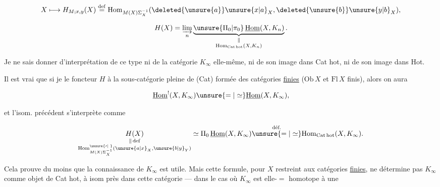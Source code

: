 
\[
 X\longmapsto H_{M;x,y}(X)\overset{\mathrm{def}}{=}
 \mathrm{Hom}_{M(X)\Sigma_X^{-1}}(\deleted{\unsure{a}}\unsure{x|a}_X,\deleted{\unsure{b}}\unsure{y|b}_X),
\]

 

\[
 H(X)=\varinjlim_n
 \underbrace{\unsure{\Pi_0|\pi_0}\,\underline{\mathrm{Hom}}(X,K_n)}_{\substack{\Vert\\\mathrm{Hom}_{\mathrm{Cat\,hot}}(X,K_n)}} .
\]

Je ne sais donner d'interprétation de ce type ni de la catégorie $K_\infty$ elle-même, ni de son image dans Cat hot, ni de son image dans Hot.

Il est vrai que si je  le foncteur $H$ à  la sous-catégorie pleine de (Cat) formée des catégories \uline{finies} ($\mathrm{Ob}\,X$ et $\mathrm{Fl}\,X$ finis), alors on aura

\[
 \underline{\mathrm{Hom}}^{!}(X,K_\infty)\unsure{=|\simeq}\underline{\mathrm{Hom}}(X,K_\infty),
\]

et l'isom. précédent s'interprète comme

\[
 \underset{\substack{\Vert\,\mathrm{def}\\
 \mathrm{Hom}^{\unsure{\prime|\;}}_{M(X)\Sigma_X^{-1}}(\unsure{a|x}_X,\unsure{b|y}_Y)}}{H(X)}
 \simeq\Pi_0\,\underline{\mathrm{Hom}}(X,K_\infty)\overset{\text{déf.}}{\unsure{=|\simeq}}
 \mathrm{Hom}_{\mathrm{Cat\,hot}}(X,K_\infty).
\]

 Cela prouve du moins que la connaissance de $K_\infty$ est utile. Mais cette formule, pour $X$ restreint aux catégories \uline{finies}, ne détermine pas $K_\infty$  comme objet de Cat hot, à isom  près dans cette catégorie ---  dans le cas   où $K_\infty$ est elle-$=$  homotope à une 

